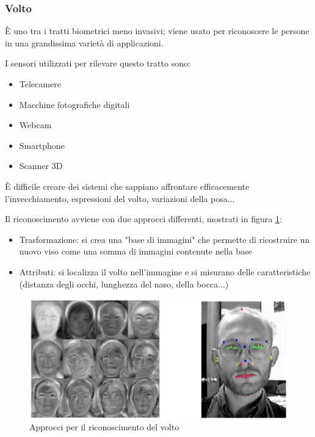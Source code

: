 \subsubsection{Volto}

È uno tra i tratti biometrici meno invasivi; viene usato per riconoscere le persone in una grandissima varietà di applicazioni.

I sensori utilizzati per rilevare questo tratto sono:
\begin{itemize}
    \item Telecamere
    \item Macchine fotografiche digitali
    \item Webcam
    \item Smartphone
    \item Scanner 3D
\end{itemize}

È difficile creare dei sistemi che sappiano affrontare efficacemente l'invecchiamento, espressioni del volto, variazioni della posa...

Il riconoscimento avviene con due approcci differenti, mostrati in figura \ref{fig:volto}:
\begin{itemize}
    \item Trasformazione: si crea una "base di immagini" che permette di ricostruire un nuovo viso come una somma di immagini contenute nella base
    \item Attributi: si localizza il volto nell'immagine e si misurano delle caratteristiche (distanza degli occhi, lunghezza del naso, della bocca...)
\end{itemize}

\begin{figure}
    \centering
    \includegraphics[width=1\linewidth]{chapters/images-chap1/volto.png}
    \caption{Approcci per il riconoscimento del volto}
    \label{fig:volto}
\end{figure}


